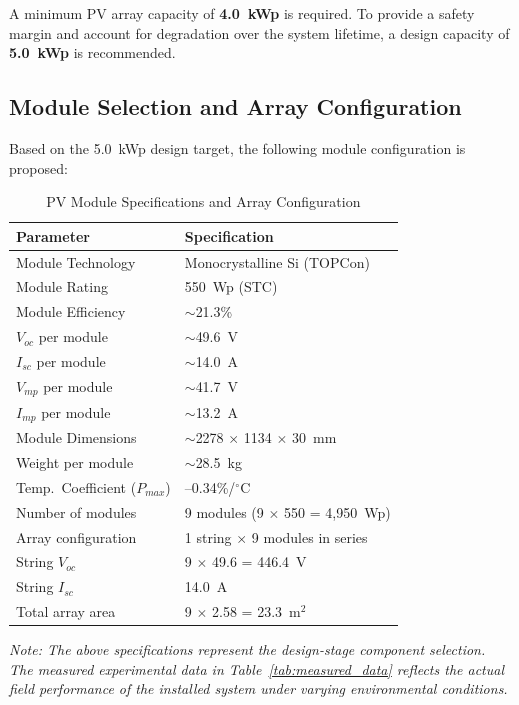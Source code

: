 A minimum PV array capacity of \textbf{4.0~kWp} is required. To provide a safety margin and account for degradation over the system lifetime, a design capacity of \textbf{5.0~kWp} is recommended.

\subsection{Module Selection and Array Configuration}

Based on the 5.0~kWp design target, the following module configuration is proposed:

\begin{table}[H]
\centering
\caption{PV Module Specifications and Array Configuration}
\label{tab:module_specs}
\begin{tabular}{@{}p{5cm} p{5cm}@{}}
\toprule
\textbf{Parameter} & \textbf{Specification} \\
\midrule
Module Technology & Monocrystalline Si (TOPCon) \\
Module Rating & 550~Wp (STC) \\
Module Efficiency & $\sim$21.3\% \\
$V_{oc}$ per module & $\sim$49.6~V \\
$I_{sc}$ per module & $\sim$14.0~A \\
$V_{mp}$ per module & $\sim$41.7~V \\
$I_{mp}$ per module & $\sim$13.2~A \\
Module Dimensions & $\sim$2278 $\times$ 1134 $\times$ 30~mm \\
Weight per module & $\sim$28.5~kg \\
Temp.\ Coefficient ($P_{max}$) & --0.34\%/$^{\circ}$C \\
\midrule
Number of modules & 9 modules (9 $\times$ 550 = 4,950~Wp) \\
Array configuration & 1 string $\times$ 9 modules in series \\
String $V_{oc}$ & 9 $\times$ 49.6 = 446.4~V \\
String $I_{sc}$ & 14.0~A \\
Total array area & 9 $\times$ 2.58 = 23.3~m$^{2}$ \\
\bottomrule
\end{tabular}
\end{table}

\textit{Note: The above specifications represent the design-stage component selection. The measured experimental data in Table~\ref{tab:measured_data} reflects the actual field performance of the installed system under varying environmental conditions.}


